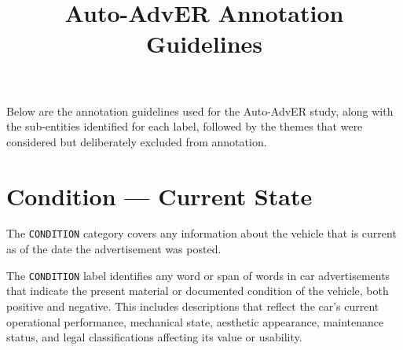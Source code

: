 \documentclass[11pt,a4paper]{article}
\title{Auto-AdvER Annotation Guidelines}
\author{}
\date{}
\newcommand{\lbl}[1]{\texttt{#1}}
\begin{document}
\maketitle
\thispagestyle{empty}

\noindent
Below are the annotation guidelines used for the Auto-AdvER study, along with the sub-entities
identified for each label, followed by the themes that were considered but deliberately excluded
from annotation.

\section*{Condition --- Current State}
The \lbl{CONDITION} category covers any information about the vehicle that is current as of the
date the advertisement was posted.

\begin{tcolorbox}[colback=gray!5!white, colframe=gray!75!black, title=Definition]
The \lbl{CONDITION} label identifies any word or span of words in car advertisements that
indicate the present material or documented condition of the vehicle, both positive and
negative. This includes descriptions that reflect the car's current operational performance,
mechanical state, aesthetic appearance, maintenance status, and legal classifications affecting
its value or usability.
\end{tcolorbox}
\end{document}
